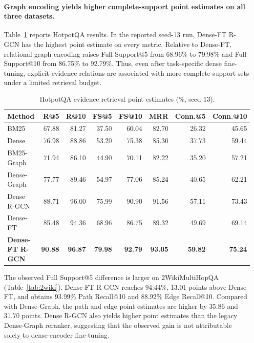 \paragraph{Graph encoding yields higher complete-support point estimates
on all three datasets.}
Table~\ref{tab:hotpot} reports HotpotQA results. In the reported seed-13
run, Dense-FT R-GCN has the highest point estimate on every metric.
Relative to Dense-FT, relational graph encoding raises Full Support@5
from 68.96\% to 79.98\% and Full Support@10 from 86.75\% to 92.79\%.
Thus, even after task-specific dense fine-tuning, explicit evidence
relations are associated with more complete support sets under a limited
retrieval budget.

\begin{table}[t]
\centering
\small
\setlength{\tabcolsep}{4pt}
\caption{HotpotQA evidence retrieval point estimates (\%, seed 13).}
\label{tab:hotpot}
\begin{tabular}{lrrrrrrr}
\hline
Method & R@5 & R@10 & FS@5 & FS@10 & MRR & Conn.@5 & Conn.@10 \\
\hline
BM25 & 67.88 & 81.27 & 37.50 & 60.04 & 82.70 & 26.32 & 45.65 \\
Dense & 76.98 & 88.86 & 53.20 & 75.38 & 85.30 & 37.73 & 59.44 \\
BM25-Graph & 71.94 & 86.10 & 44.90 & 70.11 & 82.22 & 35.20 & 57.21 \\
Dense-Graph & 77.77 & 89.46 & 54.97 & 77.06 & 85.24 & 40.65 & 62.21 \\
Dense R-GCN & 88.71 & 96.00 & 75.99 & 90.90 & 91.56 & 57.11 & 73.43 \\
Dense-FT & 85.48 & 94.36 & 68.96 & 86.75 & 89.32 & 49.69 & 69.14 \\
\textbf{Dense-FT R-GCN} & \textbf{90.88} & \textbf{96.87} &
\textbf{79.98} & \textbf{92.79} & \textbf{93.05} &
\textbf{59.82} & \textbf{75.24} \\
\hline
\end{tabular}
\end{table}

The observed Full Support@5 difference is larger on 2WikiMultiHopQA
(Table~\ref{tab:2wiki}). Dense-FT R-GCN reaches 94.44\%, 13.01 points
above Dense-FT, and obtains 93.99\% Path Recall@10 and 88.92\% Edge
Recall@10. Compared with Dense-Graph, the path and edge point estimates
are higher by 35.86 and 31.70 points. Dense R-GCN also yields higher
point estimates than the legacy Dense-Graph reranker, suggesting that the
observed gain is not attributable solely to dense-encoder fine-tuning.

